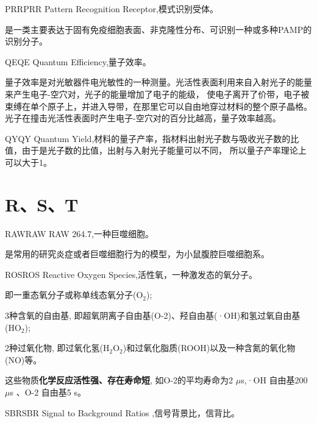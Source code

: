 \documentclass[cn,11pt,chinese]{elegantbook}
\begin{document}
\begin{theorem}{PRR}{PRR}
  Pattern Recognition Receptor,模式识别受体。

  是一类主要表达于固有免疫细胞表面、非克隆性分布、可识别一种或多种PAMP的识别分子。
\end{theorem}

\begin{theorem}{QE}{QE} 
Quantum Efficiency,量子效率。

量子效率是对光敏器件电光敏性的一种测量。光活性表面利用来自入射光子的能量来产生电子-空穴对，光子的能量增加了电子的能级，
使电子离开了价带，电子被束缚在单个原子上，并进入导带，在那里它可以自由地穿过材料的整个原子晶格。
光子在撞击光活性表面时产生电子-空穴对的百分比越高，量子效率越高。
\end{theorem}

\begin{theorem}{QY}{QY} 
  Quantum Yield,材料的量子产率，指材料出射光子数与吸收光子数的比值，由于是光子数的比值，出射与入射光子能量可以不同，
  所以量子产率理论上可以大于1。
\end{theorem}
\section{R、S、T}
\begin{theorem}{RAW}{RAW} 
  RAW 264.7,一种巨噬细胞。
  
  是常用的研究炎症或者巨噬细胞行为的模型，为小鼠腹腔巨噬细胞系。
\end{theorem} 

\begin{theorem}{ROS}{ROS} 
  Reactive Oxygen Species,活性氧，一种激发态的氧分子。
  
  即一重态氧分子或称单线态氧分子(O$_2$);

  3种含氧的自由基, 
  即超氧阴离子自由基(O-2)、羟自由基(·OH)和氢过氧自由基(HO$_2$);

  2种过氧化物, 
  即过氧化氢(H$_2$O$_2$)和过氧化脂质(ROOH)以及一种含氮的氧化物(NO)等。
  
  这些物质\textbf{化学反应活性强、存在寿命短},
  如O-2的平均寿命为2 $\mu$s,·OH 自由基200 $\mu$s 、O-2 自由基5 s。
\end{theorem} 

\begin{theorem}{SBR}{SBR} 
Signal to Background Ratios ,信号背景比，信背比。

\end{theorem} 
\end{document}
